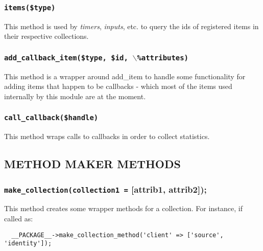 \subsubsection*{\texttt{items(\$type)}\label{xPL::Base_items_type_}}


This method is used by \emph{timers}, \emph{inputs}, etc. to query
the ids of registered items in their respective collections.

\subsubsection*{\texttt{add\_callback\_item(\$type, \$id, $\backslash$\%attributes)}\label{xPL::Base_add_callback_item_type_id_backslash_attributes_}}


This method is a wrapper around \textsf{add\_item} to handle some
functionality for adding items that happen to be callbacks - which
most of the items used internally by this module are at the moment.

\subsubsection*{\texttt{call\_callback(\$handle)}\label{xPL::Base_call_callback_handle_}}


This method wraps calls to callbacks in order to collect statistics.

\subsection*{METHOD MAKER METHODS\label{xPL::Base_METHOD_MAKER_METHODS}}
\subsubsection*{\texttt{make\_collection(collection1 =} [attrib1, attrib2]);\label{xPL::Base_make_collection_collection1_attrib1_attrib2_}}


This method creates some wrapper methods for a collection.  For instance,
if called as:

\begin{verbatim}
  __PACKAGE__->make_collection_method('client' => ['source', 'identity']);
\end{verbatim}


